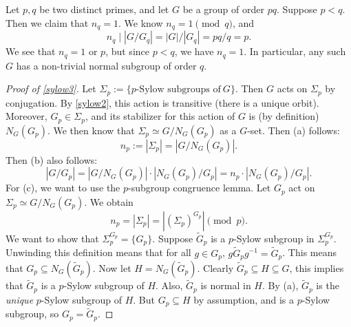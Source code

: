 \begin{example}
    Let $p,q$ be two distinct primes, and let $G$ be a group of order $pq$. Suppose $p<q$. Then we claim that $n_q=1$.
       We know $n_q=1\pmod q$, and  \[
       n_q \mid  |G/G_q| = |G| / |G_q|=pq/q=p.
       \] We see that $n_q=1$ or $p$, but since $p<q$, we have $n_q=1$.
    In particular, any such $G$ has a non-trivial normal subgroup of order $q$.
\end{example}
\begin{proof}[Proof of \cref{sylow3}]
    Let $\Sigma_p := \{p\text{-Sylow subgroups of} \ G\} $. Then $G$ acts on $\Sigma_p$ by conjugation. By \cref{sylow2}, this action is transitive (there is a unique orbit). Moreover, $G_p \in \Sigma_p$, and its stabilizer for this action of $G$ is (by definition) $N_G (G_p)$. We then know that $\Sigma_p \simeq  G / N_G(G_p)$ as a $G$-set. Then (a) follows: \[
        n_p := |\Sigma_p|=|G /N_G (G_p)|.
        \] Then (b) also follows:\[
    |G /G_p| =|G / N_G(G_p)| \cdot |N_G(G_p) / G_p|= n_p \cdot |N_G(G_p) / G_p|. 
\] For (c), we want to use the $p$-subgroup congruence lemma. Let $G_p$ act on $\Sigma _p \simeq  G / N_G(G_p)$. We obtain \[
n_p=|\Sigma_p|=|(\Sigma_p)^{G_p}|\pmod p.
\] We want to show that $\Sigma_p ^{G_p}= \{G_p\} $. Suppose $\widetilde G_p$ is a $p$-Sylow subgroup in $\Sigma_p ^{G_p}$. Unwinding this definition means that for all $g \in G_p$, $g \widetilde G_p g ^{-1} = \widetilde G_p$. This means that $G_p \subseteq N_G( \widetilde G_p)$. Now let $H= N_G(\widetilde G_p)$. Clearly $\widetilde G_p \subseteq H \subseteq G$, this implies that $\widetilde G_p$ is a $p$-Sylow subgroup of $H$. Also, $\widetilde G_p$ is normal in $H$. By (a), $\widetilde G_p$ is the \emph{unique} $p$-Sylow subgroup of $H$. But $G_p \subseteq H$ by assumption, and is a $p$-Sylow subgroup, so $G_p = \widetilde G_p$.
\end{proof}
